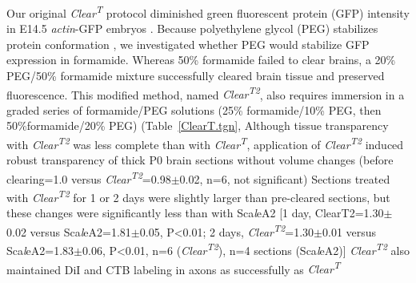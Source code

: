 Our original \emph{Clear\textsuperscript{T}} protocol diminished green fluorescent protein (GFP) intensity in E14.5 \emph{actin}-GFP embryos \cite{ikawa1995rapid}.
Because polyethylene glycol (PEG) stabilizes protein conformation \cite{rawat2010molecular}, we investigated whether PEG would stabilize GFP expression in formamide.
Whereas 50\% formamide failed to clear brains, a 20\% PEG/50\% formamide mixture successfully cleared brain tissue and preserved fluorescence.
This modified method, named \emph{Clear\textsuperscript{T2}}, also requires immersion in a graded series of formamide/PEG solutions (25\% formamide/10\% PEG, then 50\%formamide/20\% PEG) (Table~\ref{ClearT.tgn}, %
Although tissue transparency with \emph{Clear\textsuperscript{T2}} was less complete than with \emph{Clear\textsuperscript{T}}, application of \emph{Clear\textsuperscript{T2}} induced robust transparency of thick P0 brain sections without volume changes (before clearing=1.0 versus \emph{Clear\textsuperscript{T2}}=0.98$\pm$0.02, n=6, not significant) %
Sections treated with \emph{Clear\textsuperscript{T2}} for 1 or 2 days were slightly larger than pre-cleared sections, but these changes were significantly less than with Sca\emph{l}eA2 [1 day, ClearT2=1.30$\pm$0.02 versus Sca\emph{l}eA2=1.81$\pm$0.05, P<0.01; 2 days, \emph{Clear\textsuperscript{T2}}=1.30$\pm$0.01 versus Sca\emph{l}eA2=1.83$\pm$0.06, P<0.01, n=6 (\emph{Clear\textsuperscript{T2}}), n=4 sections (Sca\emph{l}eA2)] %
\emph{Clear\textsuperscript{T2}} also maintained DiI and CTB labeling in axons as successfully as \emph{Clear\textsuperscript{T}} %
